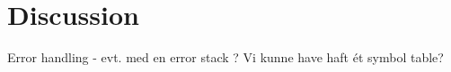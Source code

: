 \chapter{Discussion}
\label{chap:Discussion}

Error handling - evt. med en error stack ?
Vi kunne have haft ét symbol table?